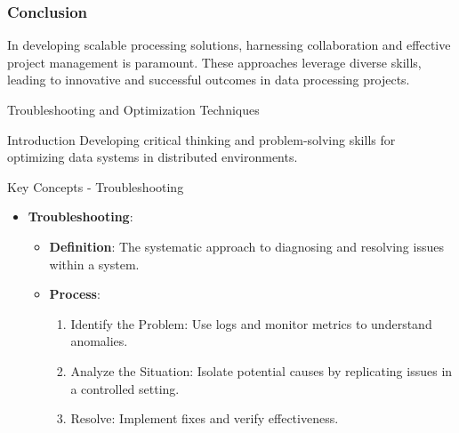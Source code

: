 \documentclass[aspectratio=169]{beamer}
\begin{document}
\begin{frame}[fragile]
    \frametitle{Conclusion}
    In developing scalable processing solutions, harnessing collaboration and effective project management is paramount. 
    These approaches leverage diverse skills, leading to innovative and successful outcomes in data processing projects.
\end{frame}

\begin{frame}{Troubleshooting and Optimization Techniques}
    \begin{block}{Introduction}
        Developing critical thinking and problem-solving skills for optimizing data systems in distributed environments.
    \end{block}
\end{frame}

\begin{frame}{Key Concepts - Troubleshooting}
    \begin{itemize}
        \item \textbf{Troubleshooting}:
        \begin{itemize}
            \item \textbf{Definition}: The systematic approach to diagnosing and resolving issues within a system.
            \item \textbf{Process}:
            \begin{enumerate}
                \item Identify the Problem: Use logs and monitor metrics to understand anomalies.
                \item Analyze the Situation: Isolate potential causes by replicating issues in a controlled setting.
                \item Resolve: Implement fixes and verify effectiveness.
            \end{enumerate}
        \end{itemize}
    \end{itemize}
\end{frame}
\end{document}
